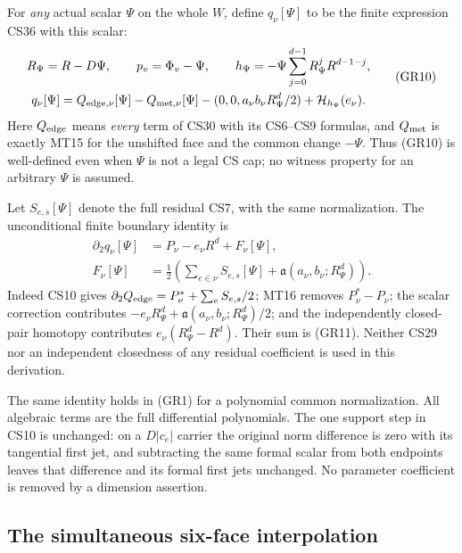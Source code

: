 For \emph{any} actual scalar $\Psi$ on the whole $W$, define
$q_\nu[\Psi]$ to be the finite expression CS36 with this scalar:
\[
 \begin{gathered}
 R_\Psi=R-D\Psi,\qquad p_v=\Phi_v-\Psi,\qquad
 h_\Psi=-\Psi\sum_{j=0}^{d-1}R_\Psi^jR^{d-1-j},\\
 q_\nu[\Psi]=Q_{{\rm edge},\nu}[\Psi]-Q_{{\rm met},\nu}[\Psi]
 -(0,0,a_\nu b_\nu R_\Psi^d/2)
                                     +\mathcal H_{h_\Psi}(e_\nu).
 \end{gathered}
 \tag{GR10}
\]
Here $Q_{\rm edge}$ means \emph{every} term of CS30 with its
CS6--CS9 formulas, and $Q_{\rm met}$ is exactly MT15 for the
unshifted face and the common change $-\Psi$.  Thus (GR10) is
well-defined even when $\Psi$ is not a legal CS cap; no witness
property for an arbitrary $\Psi$ is assumed.

Let $S_{e,s}[\Psi]$ denote the full residual CS7, with the same
normalization.  The unconditional finite boundary identity is
\[
 \begin{split}
 \partial_2q_\nu[\Psi]
    &=P_\nu-e_\nu R^d+F_\nu[\Psi],\\
 F_\nu[\Psi]
    &=\frac12\left(\sum_{e\in\nu}S_{e,s}[\Psi]
                     +\mathfrak a(a_\nu,b_\nu;R_\Psi^d)\right).
 \end{split}
 \tag{GR11}
\]
Indeed CS10 gives
$\partial_2Q_{\rm edge}=P_\nu^*+\sum_eS_{e,s}/2$;
MT16 removes $P_\nu^*-P_\nu$; the scalar correction contributes
$-e_\nu R_\Psi^d+\mathfrak a(a_\nu,b_\nu;R_\Psi^d)/2$;
and the independently closed-pair homotopy contributes
$e_\nu(R_\Psi^d-R^d)$.  Their sum is (GR11).
Neither CS29 nor an independent closedness of any residual
coefficient is used in this derivation.

The same identity holds in (GR1) for a polynomial common
normalization.  All algebraic terms are the full differential
polynomials.  The one support step in CS10 is unchanged:
on a $D|c_e|$ carrier the original norm difference is zero with
its tangential first jet, and subtracting the same formal scalar
from both endpoints leaves that difference and its formal first
jets unchanged.  No parameter coefficient is removed by a
dimension assertion.

\subsection{The simultaneous six-face interpolation}

